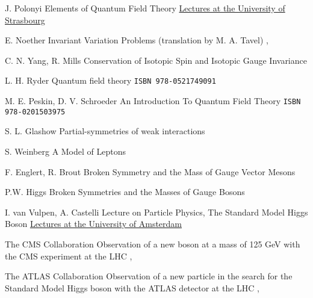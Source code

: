 

{J. Polonyi}
{Elements of Quantum Field Theory}
{\href{http://www-physique.u-strasbg.fr/~polonyi/}{Lectures at the University of Strasbourg}}

{E. Noether}
{Invariant Variation Problems (translation by M. A. Tavel)}
{, }

{C. N. Yang, R. Mills}
{Conservation of Isotopic Spin and Isotopic Gauge Invariance}
{}

{L. H. Ryder}
{Quantum field theory}
{\texttt{ISBN 978-0521749091}}

{M. E. Peskin, D. V. Schroeder}
{An Introduction To Quantum Field Theory}
{\texttt{ISBN 978-0201503975}}

{S. L. Glashow}
{Partial-symmetries of weak interactions}
{}

{S. Weinberg}
{A Model of Leptons}
{}

{F. Englert, R. Brout}
{Broken Symmetry and the Mass of Gauge Vector Mesons}
{}

{P.W. Higgs}
{Broken Symmetries and the Masses of Gauge Bosons}
{}

{I. van Vulpen, A. Castelli}
{Lecture on Particle Physics, The Standard Model Higgs Boson}
{\href{http://www.nikhef.nl/~ivov/Ivo_teaching.html}{Lectures at the University of Amsterdam}}

{The CMS Collaboration}
{Observation of a new boson at a mass of 125 GeV with the CMS experiment at the LHC}
{, }

{The ATLAS Collaboration}
{Observation of a new particle in the search for the Standard Model Higgs boson with the ATLAS detector at the LHC}
{, }

